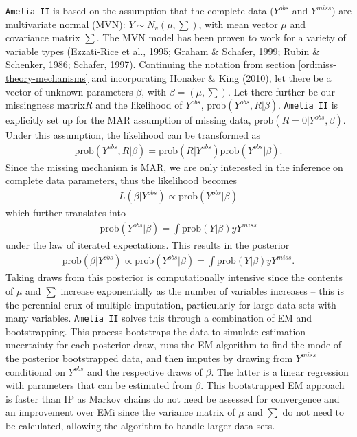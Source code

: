 \documentclass[12pt,econ]{sources/authesis}
\begin{document}
\texttt{Amelia\ II} is based on the assumption that the complete data (\(Y^{obs}\) and \(Y^{miss}\)) are multivariate normal (MVN): \(Y \sim N_v(\mu, \sum)\), with mean vector \(\mu\) and covariance matrix \(\sum\). The MVN model has been proven to work for a variety of variable types (Ezzati-Rice et al., 1995; Graham \& Schafer, 1999; Rubin \& Schenker, 1986; Schafer, 1997). Continuing the notation from section \ref{ordmiss-theory-mechanisms} and incorporating Honaker \& King (2010), let there be a vector of unknown parameters \(\beta\), with \(\beta = (\mu, \sum)\). Let there further be our missingness matrix\(R\) and the likelihood of \(Y^{obs}\), \(\text{prob}(Y^{obs}, R | \beta)\). \texttt{Amelia\ II} is explicitly set up for the MAR assumption of missing data, \(\text{prob}(R = 0 | Y^{obs}, \beta)\). Under this assumption, the likelihood can be transformed as
\begin{align}
\text{prob}(Y^{obs}, R | \beta) = \text{prob}(R | Y^{obs}) \text{prob}(Y^{obs} | \beta).
\end{align}
Since the missing mechanism is MAR, we are only interested in the inference on complete data parameters, thus the likelihood becomes
\begin{align}
L(\beta | Y^{obs}) \propto \text{prob}(Y^{obs} | \beta)
\end{align}
which further translates into
\begin{align}
\text{prob}(Y^{obs} | \beta) = \int \text{prob}(Y | \beta) y Y^{miss}
\end{align}
under the law of iterated expectations. This results in the posterior
\begin{align}
\text{prob}(\beta | Y^{obs}) \propto \text{prob}(Y^{obs} | \beta) = \int \text{prob}(Y | \beta) y Y^{miss}.
\end{align}
Taking draws from this posterior is computationally intensive since the contents of \(\mu\) and \(\sum\) increase exponentially as the number of variables increases -- this is the perennial crux of multiple imputation, particularly for large data sets with many variables. \texttt{Amelia\ II} solves this through a combination of EM and bootstrapping. This process bootstraps the data to simulate estimation uncertainty for each posterior draw, runs the EM algorithm to find the mode of the posterior bootstrapped data, and then imputes by drawing from \(Y^{miss}\) conditional on \(Y^{obs}\) and the respective draws of \(\beta\). The latter is a linear regression with parameters that can be estimated from \(\beta\). This bootstrapped EM approach is faster than IP as Markov chains do not need be assessed for convergence and an improvement over EMi since the variance matrix of \(\mu\) and \(\sum\) do not need to be calculated, allowing the algorithm to handle larger data sets.
\end{document}
